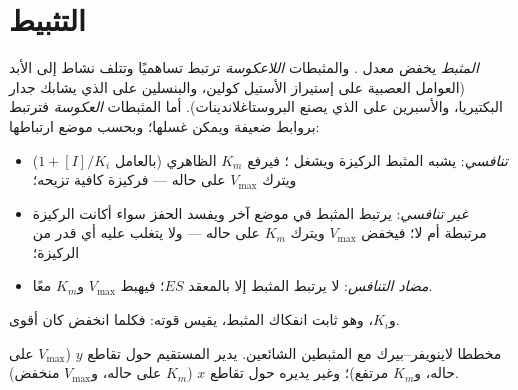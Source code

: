 \section{التثبيط}

\begin{definition}[المثبطات]\label{def:b1:enzymes:inhibitors}
\emph{المثبط} يخفض معدل . والمثبطات
\emph{اللاعكوسة} ترتبط تساهميًا وتتلف نشاط  إلى الأبد (العوامل
العصبية على إستيراز الأستيل كولين، والبنسلين على  الذي يشابك
جدار البكتيريا، والأسبرين على  الذي يصنع البروستاغلاندينات).
أما المثبطات \emph{العكوسة} فترتبط بروابط ضعيفة ويمكن غسلها؛ وبحسب
موضع ارتباطها:
\begin{itemize}
  \item \emph{تنافسي}: يشبه المثبط الركيزة
        ويشغل ؛ فيرفع $K_m$ الظاهري (بالعامل
        $1 + [I]/K_i$) ويترك $V_{\max}$ على حاله --- فركيزة كافية
        تزيحه؛
  \item \emph{غير تنافسي}: يرتبط المثبط في موضع آخر ويفسد الحفز سواء
        أكانت الركيزة مرتبطة أم لا؛ فيخفض $V_{\max}$ ويترك $K_m$ على
        حاله --- ولا يتغلب عليه أي قدر من الركيزة؛
  \item \emph{مضاد التنافس}: لا يرتبط المثبط إلا بالمعقد $ES$؛
        فيهبط $V_{\max}$ و$K_m$ معًا.
\end{itemize}
و$K_i$، وهو ثابت انفكاك المثبط، يقيس قوته: فكلما انخفض كان أقوى.
\end{definition}

\begin{omfigure}

{\small مخططا لاينويفر--بيرك مع المثبطين الشائعين.  
يدير المستقيم حول تقاطع $y$ ($V_{\max}$ على حاله، و$K_m$ مرتفع)؛
وغير  يديره حول تقاطع $x$ ($K_m$ على حاله، و$V_{\max}$
منخفض).}
\end{omfigure}

